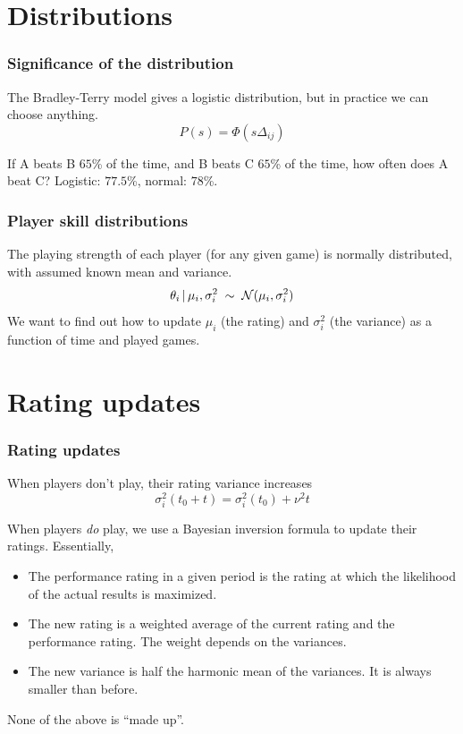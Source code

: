 \documentclass[color={usenames,dvipsnames}]{beamer}
\begin{document}
\section{Distributions}

\begin{frame}
  \frametitle{Significance of the distribution}
  
  The Bradley-Terry model gives a logistic distribution, but in practice we can
  choose anything.
  \[
    P(s) = \Phi(s\Delta_{ij})
  \]

  \begin{center}
    
  \end{center} 

  If A beats B $65$\% of the time, and B beats C $65$\% of the time, how often
  does A beat C?  Logistic: $77.5$\%, normal: $78$\%.
\end{frame}

\begin{frame}
  \frametitle{Player skill distributions}

  The playing strength of each player (for any given game) is normally
  distributed, with assumed known mean and variance.
  \[
    \theta_i \,|\, \mu_i, \sigma_i^2 \;\sim\; \mathcal{N}(\mu_i, \sigma_i^2)
  \]
  We want to find out how to update $\mu_i$ (the rating) and $\sigma_i^2$ (the
  variance) as a function of time and played games.
\end{frame}

\section{Rating updates}

\begin{frame}
  \frametitle{Rating updates}

  When players don't play, their rating variance increases
  \[
    \sigma_i^2(t_0 + t) = \sigma_i^2(t_0) + \nu^2t
  \]
  
  When players \emph{do} play, we use a Bayesian inversion formula to update
  their ratings.  Essentially,
  \begin{itemize}
    \item The performance rating in a given period is the rating at which the
      likelihood of the actual results is maximized.
    \item The new rating is a weighted average of the current rating and the
      performance rating.  The weight depends on the variances.
    \item The new variance is half the harmonic mean of the variances. It is
      always smaller than before.
  \end{itemize}
  None of the above is ``made up''.
\end{frame}
\end{document}
